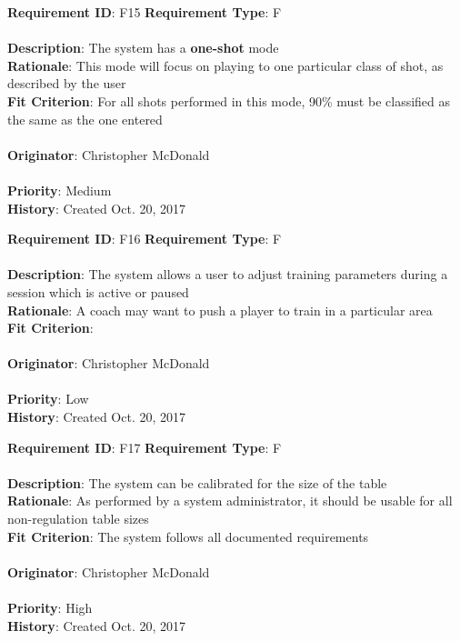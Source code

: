 \documentclass[11pt]{article}
\begin{document}
\begin{framed}
	\noindent\textbf{Requirement ID}: F15 \hfill \textbf{Requirement Type}: F \hfill\\\\
	\noindent\textbf{Description}: The system has a \textbf{one-shot} mode \\
	\textbf{Rationale}: This mode will focus on playing to one particular class of shot, as described by the user \\
	\textbf{Fit Criterion}: For all shots performed in this mode, 90\% must be classified as the same as the one entered \\\\
	\textbf{Originator}: Christopher McDonald \\\\
	\textbf{Priority}: Medium \hfill \\
	\noindent\textbf{History}: Created Oct. 20, 2017
\end{framed}

\begin{framed}
	\noindent\textbf{Requirement ID}: F16 \hfill \textbf{Requirement Type}: F \hfill\\\\
	\noindent\textbf{Description}: The system allows a user to adjust training parameters during a session which is active or paused \\
	\textbf{Rationale}: A coach may want to push a player to train in a particular area \\
	\textbf{Fit Criterion}:  \\\\
	\textbf{Originator}: Christopher McDonald \\\\
	\textbf{Priority}: Low \hfill \\
	\noindent\textbf{History}: Created Oct. 20, 2017
\end{framed}

\begin{framed}
	\noindent\textbf{Requirement ID}: F17 \hfill \textbf{Requirement Type}: F \hfill\\\\
	\noindent\textbf{Description}: The system can be calibrated for the size of the table \\
	\textbf{Rationale}: As performed by a system administrator, it should be usable for all non-regulation table sizes \\
	\textbf{Fit Criterion}: The system follows all documented requirements \\\\
	\textbf{Originator}: Christopher McDonald \\\\
	\textbf{Priority}: High \hfill \\
	\noindent\textbf{History}: Created Oct. 20, 2017
\end{framed}
\end{document}
